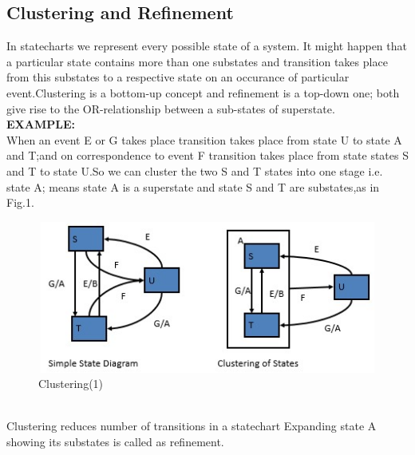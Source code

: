 \documentclass{article}
\begin{document}
\subsection{Clustering and Refinement}
In statecharts we represent every possible state of a system. It might happen that a particular state contains more than one substates and transition takes place from this substates to a respective state on an occurance of particular event.Clustering is a bottom-up concept and refinement is a top-down one; both give rise to the OR-relationship between a sub-states of superstate.\\
\textbf{EXAMPLE:}\\
When an event E or G takes place transition takes place from state U to state A and T;and on correspondence to event F transition takes place from state states S and T to state U.So we can cluster the two S and T states into one stage i.e. state A; means state A is a superstate and state S and T are substates,as in Fig.1.
\begin{figure}[h]
\centering
\includegraphics[width=12cm,height=5cm]{Screenshot.jpg}
\caption{Clustering(1)}
\end{figure}\\
Clustering reduces number of transitions in a statechart Expanding state A showing its substates is called as refinement.\\
\end{document}
